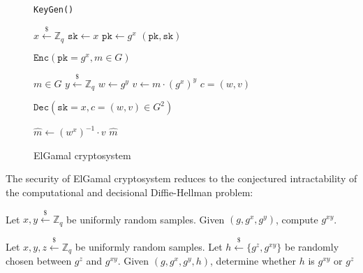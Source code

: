 \documentclass[runningheads]{llncs}
\newcommand{\pk}{\texttt{pk}}
\newcommand{\sk}{\texttt{sk}}
\newcommand{\leftsample}{\stackrel{\$}{\leftarrow}}
\begin{document}
\begin{figure}[H]
    \centering

    \begin{minipage}[t]{0.32\textwidth}
        \begin{algorithm}[H]
            \caption*{\texttt{KeyGen()}}
            \begin{algorithmic}[1]
                \State $x \leftsample \mathbb{Z}_q$
                \State $\sk \leftarrow x$
                \State $\pk \leftarrow g^x$
                \State \Return $(\pk, \sk)$
            \end{algorithmic}
        \end{algorithm}
    \end{minipage}\hfill
    \begin{minipage}[t]{0.33\textwidth}
        \begin{algorithm}[H]
            \caption*{$\texttt{Enc}(\pk = g^x, m \in G)$}
            \begin{algorithmic}[1]
                \Require $m \in G$
                \State $y \leftsample \mathbb{Z}_q$
                \State $w \leftarrow g^y$
                \State $v \leftarrow m \cdot (g^x)^y$
                \State \Return $c = (w, v)$
            \end{algorithmic}
        \end{algorithm}
    \end{minipage}\hfill
    \begin{minipage}[t]{0.33\textwidth}
        \begin{algorithm}[H]
            \caption*{$\texttt{Dec}(\sk = x, c = (w,v) \in G^2)$}
            \begin{algorithmic}[1]
                \State $\hat{m} \leftarrow (w^x)^{-1}\cdot v$
                \State \Return $\hat{m}$
            \end{algorithmic}
        \end{algorithm}
    \end{minipage}
    
    \caption{ElGamal cryptosystem}\label{fig:elgamal-routines}
\end{figure}

The security of ElGamal cryptosystem reduces to the conjectured intractability of the computational and decisional Diffie-Hellman problem:

\begin{definition}
    Let $x, y \leftsample \mathbb{Z}_q$ be uniformly random samples. Given $(g, g^x, g^y)$, compute $g^{xy}$.
\end{definition}
\begin{definition}
    Let $x, y, z \leftsample \mathbb{Z}_q$ be uniformly random samples. Let $h \leftsample \{g^z, g^{xy}\}$ be randomly chosen between $g^z$ and $g^{xy}$. Given $(g, g^x, g^y, h)$, determine whether $h$ is $g^{xy}$ or $g^z$
\end{definition}
\end{document}
